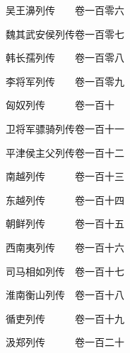 \par\hspace{3.5em}吴王濞列传　　\hspace{1.5em}卷一百零六
\par\hspace{3.5em}魏其武安侯列传\hspace{1.5em}卷一百零七
\par\hspace{3.5em}韩长孺列传　　\hspace{1.5em}卷一百零八
\par\hspace{3.5em}李将军列传　　\hspace{1.5em}卷一百零九
\par\hspace{3.5em}匈奴列传　　　\hspace{1.5em}卷一百十
\par\hspace{3.5em}卫将军骠骑列传\hspace{1.5em}卷一百十一
\par\hspace{3.5em}平津侯主父列传\hspace{1.5em}卷一百十二
\par\hspace{3.5em}南越列传　　　\hspace{1.5em}卷一百十三
\par\hspace{3.5em}东越列传　　　\hspace{1.5em}卷一百十四
\par\hspace{3.5em}朝鲜列传　　　\hspace{1.5em}卷一百十五
\par\hspace{3.5em}西南夷列传　　\hspace{1.5em}卷一百十六
\par\hspace{3.5em}司马相如列传　\hspace{1.5em}卷一百十七
\par\hspace{3.5em}淮南衡山列传　\hspace{1.5em}卷一百十八
\par\hspace{3.5em}循吏列传　　　\hspace{1.5em}卷一百十九
\par\hspace{3.5em}汲郑列传　　　\hspace{1.5em}卷一百二十
